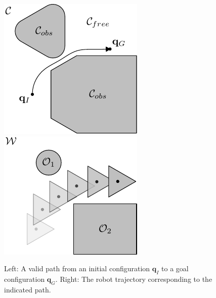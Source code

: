 \begin{figure}
\begin{center}
  \includegraphics[]{planning/figs/path_c_obs.pdf}
  \includegraphics[]{planning/figs/path_world.pdf}
\end{center}
\caption{Left: A valid path from an initial configuration
  $\mathbf{q}_{I}$ to a goal configuration $\mathbf{q}_{G}$. Right:
  The robot trajectory corresponding to the indicated path. }
\label{fig:path_triangle}
\end{figure}

